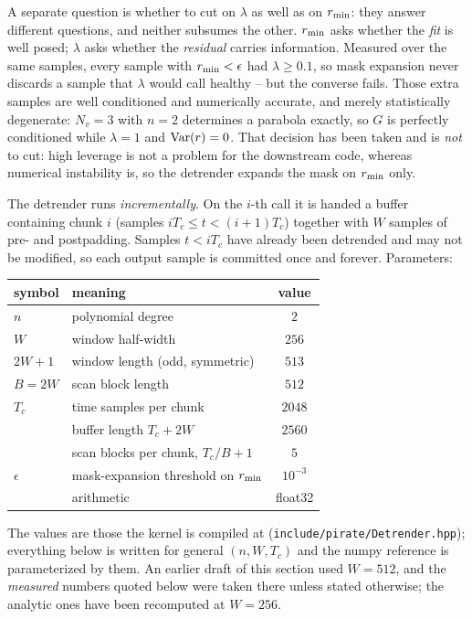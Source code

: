 \documentclass{article}
\numberwithin{equation}{section}   %
\begin{document}
A separate question is whether to cut on $\lambda$ as well as on $r_{\rm min}$: they answer different
questions, and neither subsumes the other.  $r_{\rm min}$ asks whether the {\em fit} is well posed; $\lambda$
asks whether the {\em residual} carries information.  Measured over the same samples, every sample with
$r_{\rm min} < \epsilon$ had $\lambda \ge 0.1$, so mask expansion never discards a sample that $\lambda$ would
call healthy -- but the converse fails.  Those extra samples are well conditioned and numerically accurate, and
merely statistically degenerate: $N_v = 3$ with $n = 2$ determines a parabola exactly, so $G$ is perfectly
conditioned while $\lambda = 1$ and ${\rm Var}(r) = 0$.  That decision has been taken and is {\em not} to cut:
high leverage is not a problem for the downstream code, whereas numerical instability is, so the detrender
expands the mask on $r_{\rm min}$ only.

The detrender runs {\em incrementally}.  On the $i$-th call it is handed a buffer containing chunk $i$
(samples $iT_c \le t < (i+1)T_c$) together with $W$ samples of pre- and postpadding.  Samples $t < iT_c$ have
already been detrended and may not be modified, so each output sample is committed once and forever.
Parameters:
\begin{center}
\small
\begin{tabular}{llc}
\toprule
symbol & meaning & value \\
\midrule
$n$      & polynomial degree                       & $2$ \\
$W$      & window half-width                       & $256$ \\
$2W{+}1$ & window length (odd, symmetric)          & $513$ \\
$B = 2W$ & scan block length                       & $512$ \\
$T_c$    & time samples per chunk                  & $2048$ \\
         & buffer length $T_c + 2W$                & $2560$ \\
         & scan blocks per chunk, $T_c/B + 1$      & $5$ \\
$\epsilon$ & mask-expansion threshold on $r_{\rm min}$ & $10^{-3}$ \\
         & arithmetic                              & float32 \\
\bottomrule
\end{tabular}
\end{center}
The values are those the kernel is compiled at ({\tt include/pirate/Detrender.hpp}); everything below is
written for general $(n, W, T_c)$ and the numpy reference is parameterized by them.  An earlier draft of this
section used $W = 512$, and the {\em measured} numbers quoted below were taken there unless stated otherwise;
the analytic ones have been recomputed at $W = 256$.
\end{document}
